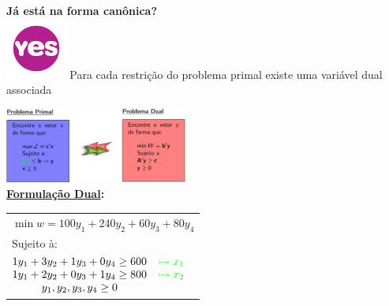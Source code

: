\documentclass{beamer}
\begin{document}
\begin{frame}
\begin{columns}
\begin{column}{6cm}
{			}
			\only<2-3>
			{
				\centering
				\Large \textbf{\color{olive}Já está na forma canônica?} \\
				\only<3>
				{
					\includegraphics[width=2cm,height=2cm]{yes.png}
				}
			}
			\only<4>
			{
				\centering
				{\color{red} Para cada restrição do problema primal existe uma variável dual associada}
			}
			\only<5->
			{
				\includegraphics[width=6cm,height=2.5cm]{Resumo_Primal_Dual.png} \\
				\textbf{\normalsize \underline{Formulação Dual}:}
				\begin{mdframed}[backgroundcolor=brown]
					\begin{table}
						\scriptsize
						\color{white}
						\begin{tabular}{l}
							$\min w = 100y_1 + 240y_2 + 60y_3 + 80y_4$ \\
							Sujeito à: \\
							$
							\begin{matrix}
								1y_1 + 3y_2 + 1y_3 + 0y_4 \ge 600   & \color{green} \rightarrowtail x_1\\
								1y_1 + 2y_2 + 0y_3 + 1y_4 \ge 800 	& \color{green} \rightarrowtail x_2\\
								y_1, y_2, y_3, y_4 \ge 0 	   		& \\
							\end{matrix}
							$
						\end{tabular}
					\end{table}
				\end{mdframed}
			}
		\end{column}
	\end{columns}
\end{frame}
\end{document}
